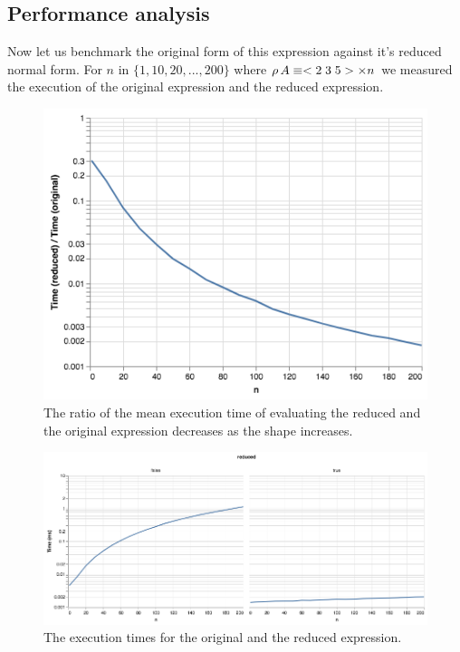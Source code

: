 \documentclass[a4paper,12pt]{article}
\begin{document}

 
\subsection{Performance analysis}

Now let us benchmark the original form of this expression against it's reduced normal form.
For $n$ in ${\{1, 10, 20, ..., 200\}}$ where $\rho\, A \equiv <2\;3\;5> \times n$ we measured the
execution of the original expression and the reduced expression.

\begin{figure}[h]
  \includegraphics[width=1\textwidth]{benchmarks/visualization-ratio.png}
  \caption{The ratio of the mean execution time of evaluating the reduced and the original expression decreases as the shape increases.}
  \label{fig:plot}
\end{figure}

\begin{figure}[h]
  \includegraphics[width=1\textwidth]{benchmarks/visualization-two-plots.png}
  \caption{The execution times for the original and the reduced expression.}
  \label{fig:plot2}
\end{figure}
\end{document}

